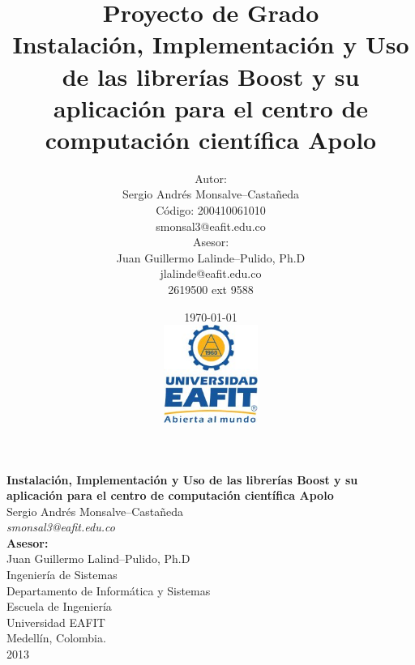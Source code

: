 \documentclass[twoside,letterpaper,12pt]{report}
\title{
	Proyecto de Grado\\[0.4cm]
	Instalación, Implementación y Uso de las librerías Boost y su aplicación para el centro de computación científica Apolo
}
\author{
	Autor:\\[0.3cm]
	Sergio Andrés Monsalve--Castañeda\\
	Código: 200410061010\\
	smonsal3@eafit.edu.co\\[0.5cm]
	Asesor: \\[0.3cm]
	Juan Guillermo Lalinde--Pulido, Ph.D\\
	jlalinde@eafit.edu.co\\
	2619500 ext 9588%
}
\date{
	\today \\[0.6cm]
	\includegraphics[width=0.23\textwidth]{aux/logo_eafit} 
}
\begin{document}

\thispagestyle{empty}
\maketitle
\thispagestyle{empty}

\thispagestyle{empty} %
\begin{center}
\textbf{{\Large Instalación, Implementación y Uso de las librerías Boost y su aplicación para el centro de computación científica Apolo}}\\[4cm]
{\Large Sergio Andrés Monsalve--Castañeda} \\ {\large \textit{smonsal3@eafit.edu.co}}\\[4cm]

{\large \textbf{Asesor:} \\Juan Guillermo Lalind--Pulido, Ph.D}\\[4cm]

Ingeniería de Sistemas \\ Departamento de Informática y Sistemas  \\ Escuela de Ingeniería \\ Universidad EAFIT \\ Medellín, Colombia.\\
2013

\end{center}
\pagebreak

\end{document}

